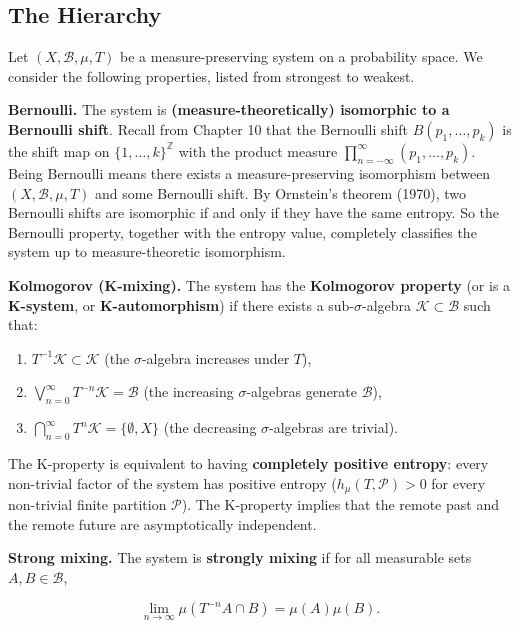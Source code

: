 \subsection{The Hierarchy}\label{sec:12.4.1}

Let $(X, \mathcal{B}, \mu, T)$ be a measure-preserving system on a probability space. We consider the following properties, listed from strongest to weakest.

\textbf{Bernoulli.} The system is \textbf{(measure-theoretically) isomorphic to a Bernoulli shift}. Recall from Chapter 10 that the Bernoulli shift $B(p_1, \ldots, p_k)$ is the shift map on $\{1, \ldots, k\}^\mathbb{Z}$ with the product measure $\prod_{n=-\infty}^{\infty} (p_1, \ldots, p_k)$. Being Bernoulli means there exists a measure-preserving isomorphism between $(X, \mathcal{B}, \mu, T)$ and some Bernoulli shift. By Ornstein's theorem (1970), two Bernoulli shifts are isomorphic if and only if they have the same entropy. So the Bernoulli property, together with the entropy value, completely classifies the system up to measure-theoretic isomorphism.

\textbf{Kolmogorov (K-mixing).} The system has the \textbf{Kolmogorov property} (or is a \textbf{K-system}, or \textbf{K-automorphism}) if there exists a sub-$\sigma$-algebra $\mathcal{K} \subset \mathcal{B}$ such that:
\begin{enumerate}[nosep]
  \item $T^{-1}\mathcal{K} \subset \mathcal{K}$ (the $\sigma$-algebra increases under $T$),
  \item $\bigvee_{n=0}^{\infty} T^{-n}\mathcal{K} = \mathcal{B}$ (the increasing $\sigma$-algebras generate $\mathcal{B}$),
  \item $\bigcap_{n=0}^{\infty} T^n \mathcal{K} = \{\emptyset, X\}$ (the decreasing $\sigma$-algebras are trivial).
\end{enumerate}

The K-property is equivalent to having \textbf{completely positive entropy}: every non-trivial factor of the system has positive entropy ($h_\mu(T, \mathcal{P}) > 0$ for every non-trivial finite partition $\mathcal{P}$). The K-property implies that the remote past and the remote future are asymptotically independent.

\textbf{Strong mixing.} The system is \textbf{strongly mixing} if for all measurable sets $A, B \in \mathcal{B}$,

\[
\lim_{n \to \infty} \mu(T^{-n}A \cap B) = \mu(A)\mu(B).
\]

